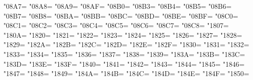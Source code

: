 \XeTeXcharclass"08A7=\KclassArabD
\XeTeXcharclass"08A8=\KclassArabD
\XeTeXcharclass"08A9=\KclassArabD
\XeTeXcharclass"08AF=\KclassArabD
\XeTeXcharclass"08B0=\KclassArabD
\XeTeXcharclass"08B3=\KclassArabD
\XeTeXcharclass"08B4=\KclassArabD
\XeTeXcharclass"08B5=\KclassArabD
\XeTeXcharclass"08B6=\KclassArabD
\XeTeXcharclass"08B7=\KclassArabD
\XeTeXcharclass"08B8=\KclassArabD
\XeTeXcharclass"08BA=\KclassArabD
\XeTeXcharclass"08BB=\KclassArabD
\XeTeXcharclass"08BC=\KclassArabD
\XeTeXcharclass"08BD=\KclassArabD
\XeTeXcharclass"08BE=\KclassArabD
\XeTeXcharclass"08BF=\KclassArabD
\XeTeXcharclass"08C0=\KclassArabD
\XeTeXcharclass"08C1=\KclassArabD
\XeTeXcharclass"08C2=\KclassArabD
\XeTeXcharclass"08C3=\KclassArabD
\XeTeXcharclass"08C4=\KclassArabD
\XeTeXcharclass"08C5=\KclassArabD
\XeTeXcharclass"08C6=\KclassArabD
\XeTeXcharclass"08C7=\KclassArabD
\XeTeXcharclass"08C8=\KclassArabD
\XeTeXcharclass"1807=\KclassArabD
\XeTeXcharclass"180A=\KclassArabD
\XeTeXcharclass"1820=\KclassArabD
\XeTeXcharclass"1821=\KclassArabD
\XeTeXcharclass"1822=\KclassArabD
\XeTeXcharclass"1823=\KclassArabD
\XeTeXcharclass"1824=\KclassArabD
\XeTeXcharclass"1825=\KclassArabD
\XeTeXcharclass"1826=\KclassArabD
\XeTeXcharclass"1827=\KclassArabD
\XeTeXcharclass"1828=\KclassArabD
\XeTeXcharclass"1829=\KclassArabD
\XeTeXcharclass"182A=\KclassArabD
\XeTeXcharclass"182B=\KclassArabD
\XeTeXcharclass"182C=\KclassArabD
\XeTeXcharclass"182D=\KclassArabD
\XeTeXcharclass"182E=\KclassArabD
\XeTeXcharclass"182F=\KclassArabD
\XeTeXcharclass"1830=\KclassArabD
\XeTeXcharclass"1831=\KclassArabD
\XeTeXcharclass"1832=\KclassArabD
\XeTeXcharclass"1833=\KclassArabD
\XeTeXcharclass"1834=\KclassArabD
\XeTeXcharclass"1835=\KclassArabD
\XeTeXcharclass"1836=\KclassArabD
\XeTeXcharclass"1837=\KclassArabD
\XeTeXcharclass"1838=\KclassArabD
\XeTeXcharclass"1839=\KclassArabD
\XeTeXcharclass"183A=\KclassArabD
\XeTeXcharclass"183B=\KclassArabD
\XeTeXcharclass"183C=\KclassArabD
\XeTeXcharclass"183D=\KclassArabD
\XeTeXcharclass"183E=\KclassArabD
\XeTeXcharclass"183F=\KclassArabD
\XeTeXcharclass"1840=\KclassArabD
\XeTeXcharclass"1841=\KclassArabD
\XeTeXcharclass"1842=\KclassArabD
\XeTeXcharclass"1843=\KclassArabD
\XeTeXcharclass"1844=\KclassArabD
\XeTeXcharclass"1845=\KclassArabD
\XeTeXcharclass"1846=\KclassArabD
\XeTeXcharclass"1847=\KclassArabD
\XeTeXcharclass"1848=\KclassArabD
\XeTeXcharclass"1849=\KclassArabD
\XeTeXcharclass"184A=\KclassArabD
\XeTeXcharclass"184B=\KclassArabD
\XeTeXcharclass"184C=\KclassArabD
\XeTeXcharclass"184D=\KclassArabD
\XeTeXcharclass"184E=\KclassArabD
\XeTeXcharclass"184F=\KclassArabD
\XeTeXcharclass"1850=\KclassArabD
